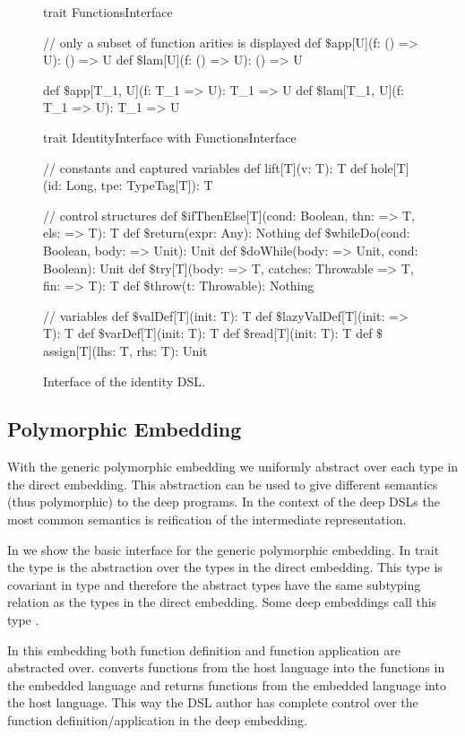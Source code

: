 \begin{figure}
\begin{listingtiny}
trait FunctionsInterface {
  // only a subset of function arities is displayed
  def $\$$app[U](f: () => U): () => U
  def $\$$lam[U](f: () => U): () => U

  def $\$$app[T_1, U](f: T_1 => U): T_1 => U
  def $\$$lam[T_1, U](f: T_1 => U): T_1 => U
}

trait IdentityInterface with FunctionsInterface {
  // constants and captured variables
  def lift[T](v: T): T
  def hole[T](id: Long, tpe: TypeTag[T]): T

  // control structures
  def $\$$ifThenElse[T](cond: Boolean, thn: => T, els: => T): T
  def $\$$return(expr: Any): Nothing
  def $\$$whileDo(cond: Boolean, body: => Unit): Unit
  def $\$$doWhile(body: => Unit, cond: Boolean): Unit
  def $\$$try[T](body: => T, catches: Throwable => T, fin: => T): T
  def $\$$throw(t: Throwable): Nothing

  // variables
  def $\$$valDef[T](init: T): T
  def $\$$lazyValDef[T](init: => T): T
  def $\$$varDef[T](init: T): T
  def $\$$read[T](init: T): T
  def $\$$assign[T](lhs: T, rhs: T): Unit
}
\end{listingtiny}
\caption{Interface of the identity DSL.}
\label{fig:interface-identity-dsl}
\end{figure}

\subsection{Polymorphic Embedding}
\label{sec:polymorphic-embedding}

With the generic polymorphic embedding we uniformly abstract over each type in the
 direct embedding. This abstraction can be used to give different semantics
 (thus polymorphic) to the deep programs. In the context of the deep DSLs the most
 common semantics is reification of the intermediate representation.

In  we show the basic interface
 for the generic polymorphic embedding. In trait
  the type  is the abstraction over the types in the
 direct embedding. This type is covariant in type  and therefore the abstract
 types have the same subtyping relation as the types in the direct embedding. Some deep
 embeddings call this type .

In this embedding both function definition and function application are abstracted over.
 converts functions from the host language into the functions in the embedded language and
 returns functions from the embedded language into the host language. This way the DSL author
has complete control over the function definition/application in the deep embedding.

